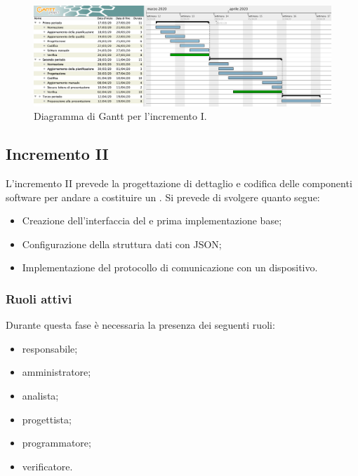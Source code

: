 		\begin{landscape}

          \begin{figure}[H]
            \centering
            \includegraphics[width=\linewidth]{images/ganttDettaglioCodifica} %
            \caption{Diagramma di Gantt per l'incremento I.}
          \end{figure}		

		\end{landscape}


		\subsection{Incremento II}
			
			L'incremento II prevede la progettazione di dettaglio e codifica delle componenti software per andare a costituire un . Si prevede di svolgere quanto segue:
			\begin{itemize}
				\item Creazione dell'interfaccia del  e prima implementazione base;
				\item Configurazione della struttura dati con JSON;
				\item Implementazione del protocollo di comunicazione con un dispositivo.
			\end{itemize}
			
			\subsubsection{Ruoli attivi}
			
				Durante questa fase è necessaria la presenza dei seguenti ruoli:
				\begin{itemize}
					\item responsabile;
					\item amministratore;
					\item analista;
					\item progettista;
					\item programmatore;
					\item verificatore.
				\end{itemize}
			
